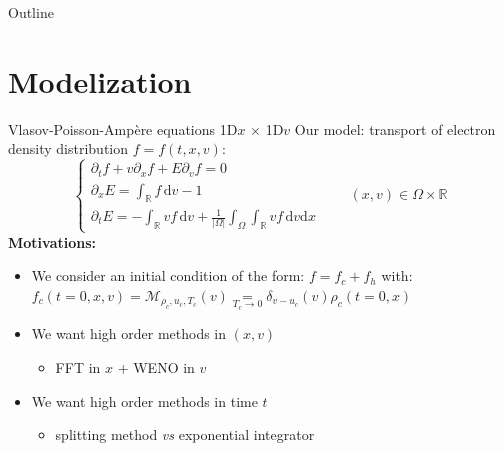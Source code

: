 \documentclass{beamer}
\newcommand{\mbold}[1]{{\textbf{\color{PLB}#1}}}
\begin{document}
\begin{frame}{Outline}
  \tableofcontents
\end{frame}

\section{Modelization}

\begin{frame}{Vlasov-Poisson-Ampère equations 1D$x$ $\times$ 1D$v$}
  Our model: transport of electron density distribution $f = f(t,x,v)$:
  $$
    \begin{cases}
      \partial_t f + v\partial_x f + E\partial_v f = 0 \\
      \partial_x E = \int_\mathbb{R} f\,\mathrm{d}v - 1 \\
      \partial_t E = -\int_{\mathbb{R}}vf\,\mathrm{d}v + \frac{1}{|\Omega|}\int_\Omega\int_\mathbb{R}vf\,\mathrm{d}v\mathrm{d}x
    \end{cases}\qquad(x,v)\in \Omega\times\mathbb{R}
  $$
  \mbold{Motivations:}
  \begin{itemize}
    \item We consider an initial condition of the form: $f = f_c + f_h$ with: $f_c(t=0,x,v) = \mathcal{M}_{\rho_c,u_c,T_c}(v) \underset{T_c\to 0}{=} \delta_{v-u_c}(v)\rho_c(t=0,x)$
    \item We want high order methods in $(x,v)$ \begin{itemize}\item FFT in $x$ + WENO in $v$\end{itemize}
    \item We want high order methods in time $t$ \begin{itemize}\item splitting method \emph{vs} exponential integrator\end{itemize}
  \end{itemize}
\end{frame}
\end{document}
